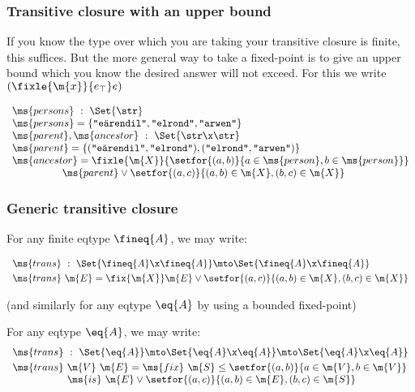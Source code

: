 \documentclass[preprint]{sigplanconf}
\begin{document}
\subsubsection{Transitive closure with an upper bound}

If you know the type over which you are taking your transitive closure is
finite, this suffices. But the more general way to take a fixed-point is to give
an upper bound which you know the desired answer will not exceed. For this we
write $(\fixle{\m{x}}{e_\top} e)$

\[\begin{array}{l}
\ms{persons} ~:~ \Set{\str}\\
\ms{persons} = \{\texttt{"e\"arendil"}, \texttt{"elrond"}, \texttt{"arwen"}\}\\
\ms{parent}, \ms{ancestor} ~:~ \Set{\str \x \str}\\
\ms{parent} = \{(\texttt{"e\"arendil"}, \texttt{"elrond"}),
(\texttt{"elrond"}, \texttt{"arwen"})\}\\
\ms{ancestor} = \fixle{\m{X}}{%
  \setfor{(a,b)}{a \in \ms{person}, b \in \ms{person}}}
\\
\hspace{4.87em}\ms{parent} \vee
\setfor{(a,c)}{(a,b) \in \m{X}, (b,c) \in \m{X}}
\end{array}\]

\subsubsection{Generic transitive closure}

For any finite eqtype $\fineq{A}$, we may write:

\[\begin{array}{l}
\ms{trans} ~:~ \Set{\fineq{A} \x \fineq{A}} \mto \Set{\fineq{A} \x \fineq{A}}
\vspace{0.3em}\\
\ms{trans}\ \m{E} = \fix{\m{X}} \m{E} \vee %
\setfor{(a,c)}{(a,b) \in \m{X}, (b,c) \in \m{X}}
\end{array}\]

\TODO (and similarly for any eqtype $\eq{A}$ by using a bounded fixed-point)

For any eqtype $\eq{A}$, we may write:
\[\begin{array}{l}
\ms{trans} ~:~
\Set{\eq{A}} \mto \Set{\eq{A} \x \eq{A}} \mto \Set{\eq{A} \x \eq{A}}
\vspace{0.3em}\\
\ms{trans}\ \m{V}\ \m{E} = %
\ms{fix}~ \m{S} \le \setfor{(a,b)}{a\in \m{V}, b \in \m{V}}\\
\hspace{5.35em}\ms{is}~ \m{E} \vee %
\setfor{(a,c)}{(a,b) \in \m{E}, (b,c) \in \m{S}}\\
\end{array}\]
\end{document}
